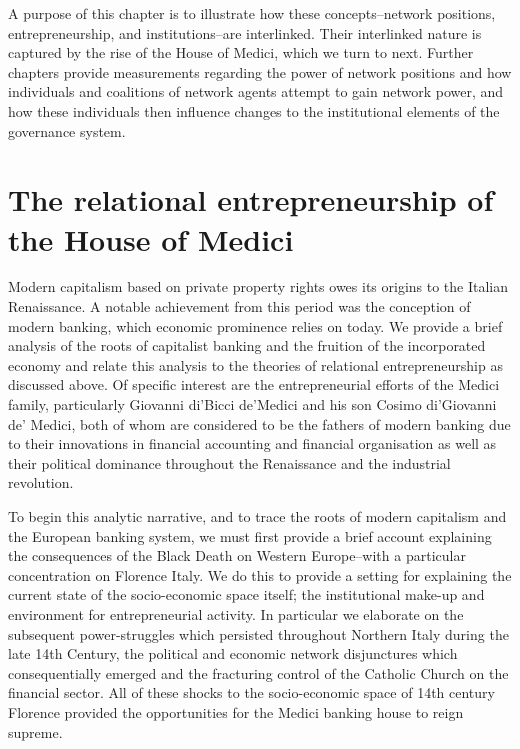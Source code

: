 A purpose of this chapter is to illustrate how these concepts--network positions, entrepreneurship, and institutions--are interlinked. Their interlinked nature is captured by the rise of the House of Medici, which we turn to next. Further chapters provide measurements regarding the power of network positions and how individuals and coalitions of network agents attempt to gain network power, and how these individuals then influence changes to the institutional elements of the governance system.

\section{The relational entrepreneurship of the House of Medici} \label{ex:houseofMedici}

Modern capitalism based on private property rights owes its origins to the Italian Renaissance. A notable achievement from this period was the conception of modern banking, which economic prominence relies on today. We provide a brief analysis of the roots of capitalist banking and the fruition of the incorporated economy and relate this analysis to the theories of relational entrepreneurship as discussed above. Of specific interest are the entrepreneurial efforts of the Medici family, particularly Giovanni di'Bicci de'Medici and his son Cosimo di'Giovanni de' Medici, both of whom are considered to be the fathers of modern banking due to their innovations in financial accounting and financial organisation as well as their political dominance throughout the Renaissance and the industrial revolution.

To begin this analytic narrative, and to trace the roots of modern capitalism and the European banking system, we must first provide a brief account explaining the consequences of the Black Death on Western Europe--with a particular concentration on Florence Italy. We do this to provide a setting for explaining the current state of the socio-economic space itself; the institutional make-up and environment for entrepreneurial activity. In particular we elaborate on the subsequent power-struggles which persisted throughout Northern Italy during the late 14th Century, the political and economic network disjunctures which consequentially emerged and the fracturing control of the Catholic Church on the financial sector. All of these shocks to the socio-economic space of 14th century Florence provided the opportunities for the Medici banking house to reign supreme.

